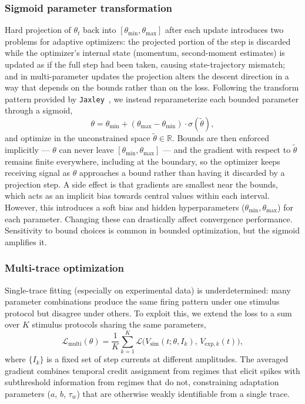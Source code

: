 \subsubsection{Sigmoid parameter transformation}\label{sec:method:opt:stabilization:sigmoid}
Hard projection of $\theta_t$ back into $[\theta_{\min}, \theta_{\max}]$ after each update introduces two problems for adaptive optimizers:
the projected portion of the step is discarded while the optimizer's internal state (momentum, second-moment estimates) is updated as if the full step had been taken, causing state-trajectory mismatch;
and in multi-parameter updates the projection alters the descent direction in a way that depends on the bounds rather than on the loss.
Following the transform pattern provided by \texttt{Jaxley}~\cite{Deistler2025},
we instead reparameterize each bounded parameter through a sigmoid,
\begin{equation}
    \theta = \theta_{\min} + (\theta_{\max} - \theta_{\min}) \cdot \sigma(\tilde{\theta}),
\end{equation}
and optimize in the unconstrained space $\tilde{\theta}\in\mathbb{R}$.
Bounds are then enforced implicitly --- $\theta$ can never leave $[\theta_{\min},\theta_{\max}]$ ---
and the gradient with respect to $\tilde{\theta}$ remains finite everywhere, including at the boundary,
so the optimizer keeps receiving signal as $\theta$ approaches a bound rather than having it discarded by a projection step.
A side effect is that gradients are smallest near the bounds, which acts as an implicit bias towards central values within each interval.
However, this introduces a soft bias and hidden hyperparameters ($\theta_{\min}, \theta_{\max}$) for each parameter.
Changing these can drastically affect convergence performance.
Sensitivity to bound choices is common in bounded optimization, but the sigmoid amplifies it.

\subsubsection{Multi-trace optimization}\label{sec:method:opt:stabilization:multi-trace}
Single-trace fitting (especially on experimental data) is underdetermined: many parameter combinations produce the same firing pattern under one stimulus protocol but disagree under others.
To exploit this, we extend the loss to a sum over $K$ stimulus protocols sharing the same parameters,
\begin{equation}
    \mathcal{L}_{\mathrm{multi}}(\theta) = \frac{1}{K} \sum_{k=1}^{K} \mathcal{L}\bigl(V_{\mathrm{sim}}(t; \theta, I_k),\, V_{\mathrm{exp},k}(t)\bigr),
\end{equation}
where $\{I_k\}$ is a fixed set of step currents at different amplitudes.
The averaged gradient combines temporal credit assignment from regimes that elicit spikes with subthreshold information from regimes that do not,
constraining adaptation parameters ($a$, $b$, $\tau_w$) that are otherwise weakly identifiable from a single trace.


